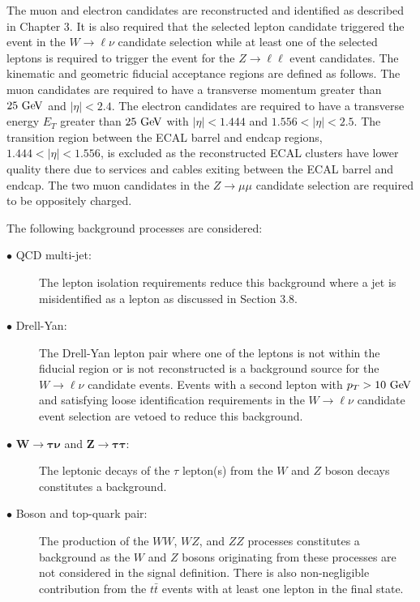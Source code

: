 The muon and electron candidates are reconstructed and identified as described in Chapter 3. It is also required that the selected lepton candidate triggered the event in the $W\rightarrow \ell\nu$ candidate selection while at least one of the selected leptons is required to trigger the event for the $Z\rightarrow \ell\ell$ event candidates. The kinematic and geometric fiducial acceptance regions are defined as follows. The muon candidates are required to have a transverse momentum greater than $25~\mathrm{Ge\kern -0.1em V}$ and $|\eta|<2.4$. The electron candidates are required to have a transverse energy $E_{T}$ greater than $25~\mathrm{Ge\kern -0.1em V}$ with $|\eta|<1.444$ and $1.556<|\eta|<2.5$.  The transition region between the ECAL barrel and endcap regions, $1.444<|\eta|<1.556$, is excluded as the reconstructed ECAL clusters have lower quality there due to services and cables exiting between the ECAL barrel and endcap. The two muon candidates in the  $Z\rightarrow \mu\mu$ candidate selection are required to be oppositely charged.

The following background processes are considered:
\begin{description}
\item[$\bullet$ QCD multi-jet:] The lepton isolation requirements reduce this background where a jet is misidentified as a lepton as discussed in Section 3.8.  
\item[$\bullet$ Drell-Yan:] The Drell-Yan lepton pair where one of the leptons is not within the fiducial region or is not reconstructed is a background source for the $W \rightarrow \ell\nu$ candidate events. Events with a second lepton with $p_{T}>10~\mathrm{Ge\kern -0.1em V}$ and satisfying loose identification requirements in the $W \rightarrow \ell\nu$ candidate event selection are vetoed to reduce this background. 
\item[$\bullet$ $\boldsymbol{W\rightarrow \tau\nu}$ and $\boldsymbol{Z\rightarrow \tau\tau}$:] The leptonic decays of the $\tau$ lepton(s) from the $W$ and $Z$ boson decays constitutes a background. 
\item[$\bullet$ Boson and top-quark pair:] The production of the $WW$, $WZ$, and $ZZ$ processes constitutes a background as the $W$ and $Z$ bosons originating from these processes are not considered in the signal definition. There is also non-negligible contribution from the $t\bar{t}$ events with at least one lepton in the final state.
\end{description}    


